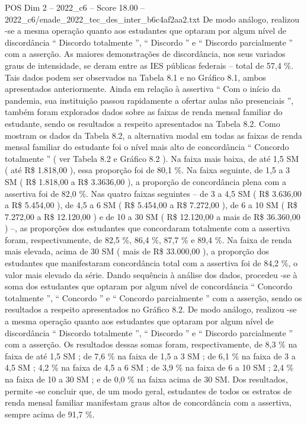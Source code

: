 \begin{textsample}{POS Dim 2 – 2022\_c6 – Score 18.00 – 2022\_c6/enade\_2022\_tec\_des\_inter\_b6c4af2aa2.txt}
De modo análogo, realizou -se a mesma operação quanto aos estudantes que optaram por algum nível de discordância “ Discordo totalmente ”, “ Discordo ” e “ Discordo parcialmente ” com a asserção.
As maiores demonstrações de discordância, nos seus variados graus de intensidade, se deram entre as IES públicas federais – total de 57,4 \%.
Tais dados podem ser observados na Tabela 8.1 e no Gráfico 8.1, ambos apresentados anteriormente.
Ainda em relação à assertiva “ Com o início da pandemia, sua instituição passou rapidamente a ofertar aulas não presenciais ”, também foram explorados dados sobre as faixas de renda mensal familiar do estudante, sendo os resultados a respeito apresentados na Tabela 8.2.
Como mostram os dados da Tabela 8.2, a alternativa modal em todas as faixas de renda mensal familiar do estudante foi o nível mais alto de concordância “ Concordo totalmente ” ( ver Tabela 8.2 e Gráfico 8.2 ).
Na faixa mais baixa, de até 1,5 SM ( até R\$ 1.818,00 ), essa proporção foi de 80,1 \%.
Na faixa seguinte, de 1,5 a 3 SM ( R\$ 1.818,00 a R\$ 3.3636,00 ), a proporção de concordância plena com a assertiva foi de 82,0 \%.
Nas quatro faixas seguintes – de 3 a 4,5 SM ( R\$ 3.636,00 a R\$ 5.454,00 ), de 4,5 a 6 SM ( R\$ 5.454,00 a R\$ 7.272,00 ), de 6 a 10 SM ( R\$ 7.272,00 a R\$ 12.120,00 ) e de 10 a 30 SM ( R\$ 12.120,00 a mais de R\$ 36.360,00 ) –, as proporções dos estudantes que concordaram totalmente com a assertiva foram, respectivamente, de 82,5 \%, 86,4 \%, 87,7 \% e 89,4 \%.
Na faixa de renda mais elevada, acima de 30 SM ( mais de R\$ 33.000,00 ), a proporção dos estudantes que manifestaram concordância total com a assertiva foi de 84,2 \%, o valor mais elevado da série.
Dando sequência à análise dos dados, procedeu -se à soma dos estudantes que optaram por algum nível de concordância “ Concordo totalmente ”, “ Concordo ” e “ Concordo parcialmente ” com a asserção, sendo os resultados a respeito apresentados no Gráfico 8.2.
De modo análogo, realizou -se a mesma operação quanto aos estudantes que optaram por algum nível de discordância “ Discordo totalmente ”, “ Discordo ” e “ Discordo parcialmente ” com a asserção.
Os resultados dessas somas foram, respectivamente, de 8,3 \% na faixa de até 1,5 SM ; de 7,6 \% na faixa de 1,5 a 3 SM ; de 6,1 \% na faixa de 3 a 4,5 SM ; 4,2 \% na faixa de 4,5 a 6 SM ; de 3,9 \% na faixa de 6 a 10 SM ; 2,4 \% na faixa de 10 a 30 SM ; e de 0,0 \% na faixa acima de 30 SM.
Dos resultados, permite -se concluir que, de um modo geral, estudantes de todos os estratos de renda mensal familiar manifestam graus altos de concordância com a assertiva, sempre acima de 91,7 \%.

\end{textsample}
